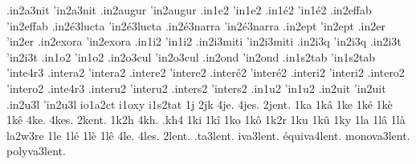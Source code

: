 {                    .in2a3nit
                    'in2a3nit
                    .in2augur
                    'in2augur
                    .in1e2
                    'in1e2
                    .in1é2
                    'in1é2
                    .in2effab %
                    'in2effab
                    .in2é3lucta
                    'in2é3lucta
                    .in2é3narra
                    'in2é3narra
                    .in2ept
                    'in2ept
                    .in2er
                    'in2er
                    .in2exora %
                    'in2exora
                    .in1i2
                    'in1i2
                    .in2i3miti
                    'in2i3miti
                    .in2i3q
                    'in2i3q
                    .in2i3t
                    'in2i3t
                    .in1o2
                    'in1o2
                    .in2o3cul
                    'in2o3cul
                    .in2ond
                    'in2ond
                    .in1s2tab
                    'in1s2tab
                    'inte4r3
                    .intera2
                    'intera2
                    .intere2
                    'intere2
                    .interé2
                    'interé2
                    .interi2
                    'interi2
                    .intero2
                    'intero2
                    .inte4r3
                    .interu2
                    'interu2
                    .inters2
                    'inters2
                    .in1u2
                    'in1u2
                    .in2uit
                    'in2uit
                    .in2u3l
                    'in2u3l
                    io1a2ct
                    i1oxy
                    i1s2tat
1j
2jk
4je.
4jes.
2jent. %
1ka
1kâ
1ke
1ké
1kè
1kê
4ke.
4kes.
2kent. %
1k2h
4kh.
.kh4
1ki
1kî
1ko
1kô
1k2r
1ku
1kû
1ky
1la
1lâ
1là
                    la2w3re
1le
1lé
1lè
1lê
4le.
4les.
      2lent.
   .ta3lent.
   iva3lent.
équiva4lent.
monova3lent.
polyva3lent.
}
